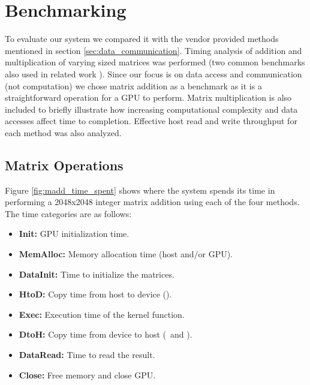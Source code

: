 \section{Benchmarking}
\label{sec:benchmarking}

To evaluate our system we compared it with the vendor provided methods
mentioned in section \ref{sec:data_communication}. Timing analysis of
addition and multiplication of varying sized matrices was performed
(two common benchmarks also used in related work
\cite{Rossbach_SOSP11}). Since our focus is on data access and
communication (not computation) we chose matrix addition as a benchmark as it is a
straightforward operation for a GPU to perform. Matrix multiplication
is also included to briefly illustrate how increasing computational
complexity and data accesses affect time to completion. Effective host read and write throughput for each method was also analyzed.

\subsection{Matrix Operations}
Figure \ref{fig:madd_time_spent} shows where the system spends its time in performing a 2048x2048 integer matrix addition using each of the four methods. The time categories are as follows:

\begin{itemize}
 \item {\bf Init: }GPU initialization time.
 \item {\bf MemAlloc: }Memory allocation time (host and/or GPU).
 \item {\bf DataInit: }Time to initialize the matrices.
 \item {\bf HtoD: }Copy time from host to device (\hd).
 \item {\bf Exec: }Execution time of the kernel function.
 \item {\bf DtoH: }Copy time from device to host (\hd\ and \dmh).
 \item {\bf DataRead: }Time to read the result.
 \item {\bf Close: }Free memory and close GPU.
\end{itemize}

